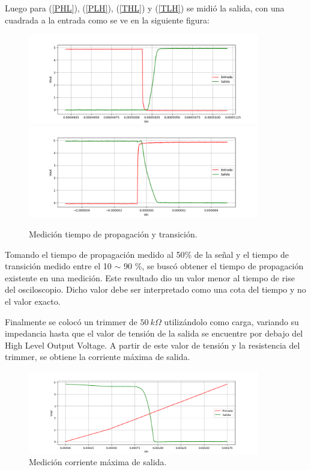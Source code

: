 Luego para (\ref{PHL}), (\ref{PLH}), (\ref{THL}) y (\ref{TLH}) se midió la salida, con una cuadrada a la entrada como se ve en la siguiente figura:
\begin{figure}[H]	
	\centering
	\includegraphics[width=0.9\textwidth]{ImagenesEjercicio1/DC-SWEEP/0t1mtl.PNG}
	\includegraphics[width=0.9\textwidth]{ImagenesEjercicio1/DC-SWEEP/1t0mtl.PNG}
	\caption{Medición tiempo de propagación y transición.}
	\label{fig:MedicionTiempos}
\end{figure}

Tomando el tiempo de propagación medido al 50\% de la señal y el tiempo de transición medido entre el 10 $\sim$ 90 \%, se buscó obtener el tiempo de propagación existente en una medición. Este resultado dio un valor menor al tiempo de rise del osciloscopio. Dicho valor debe ser interpretado como una cota del tiempo y no el valor exacto. 

Finalmente se colocó un trimmer de $50 \ k\Omega$ utilizándolo como carga, variando su impedancia hasta que el valor de tensión de la salida se encuentre por debajo del High Level Output Voltage. A partir de este valor de tensión y la resistencia del trimmer, se obtiene la corriente máxima de salida.
\begin{figure}[H]	
	\centering
	\includegraphics[width=0.9\textwidth]{ImagenesEjercicio1/DC-SWEEP/OutputCurrent.PNG}
	\caption{Medición corriente máxima de salida.}
	\label{fig:OutputCurrent}
\end{figure}

